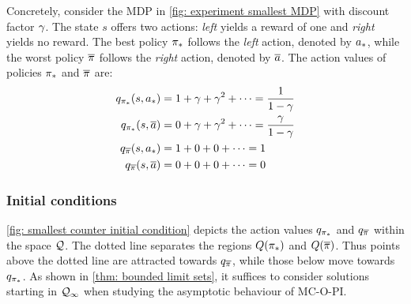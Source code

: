 Concretely, consider the 
MDP in \autoref{fig: experiment smallest MDP} with discount factor $\gamma$. The state $s$ offers two actions: \textit{left} yields a reward of one and \textit{right} yields no reward. The best policy ${\pi}_*$ follows the \textit{left} action, denoted by ${a}_*$, while the worst policy $\overline{\pi}$ follows the \textit{right} action, denoted by $\overline{a}$. 
The action values of policies ${\pi}_*$ and $\overline{\pi}$ are:
\begin{align*}
    q_{{\pi}_*}(s, {a}_*) &= 1 + \gamma + \gamma^2 + \cdots = \dfrac{1}{1-\gamma}
    \\
    q_{{\pi}_*}(s, \overline{a}) &= 0 + \gamma + \gamma^2 + \cdots = \dfrac{\gamma}{1-\gamma}
    \\
    q_{\overline{\pi}}(s, {a}_*) &= 1 + 0 + 0 + \cdots = 1
    \\
    q_{\overline{\pi}}(s, \overline{a}) &= 0 + 0 + 0 + \cdots = 0
\end{align*}






\subsubsection{Initial conditions}

\autoref{fig: smallest counter initial condition} depicts the action values $q_{{\pi}_*}$ and $q_{\overline{\pi}}$ within the space $\mathcal{Q}$. The dotted line separates the regions $Q({\pi}_*)$ and $Q(\overline{\pi})$.
Thus points above the dotted line are attracted towards $q_{\overline{\pi}}$, while those below move towards $q_{{\pi}_*}$.
As shown in \autoref{thm: bounded limit sets}, it suffices to consider solutions starting in $\mathcal{Q}_\infty$ when studying the asymptotic behaviour of MC-O-PI.

